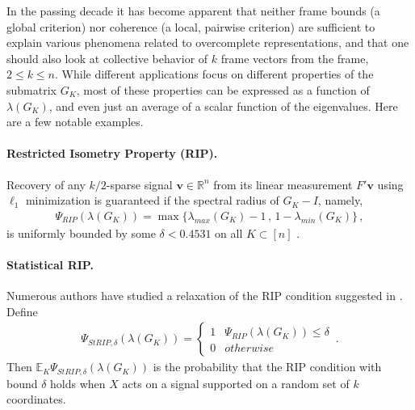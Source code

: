 \documentclass[a4paper,12pt]{article}
\newcommand{\comm}[1]{ {\tt \color{blue} [Comment:#1] } }
\newcommand{\V}[1]{\ensuremath{\mathbf{#1}}}
\newcommand{\R}{\ensuremath{\mathbb{R}}}
\newcommand{\E}{\ensuremath{\mathbb{E}}}
\newcommand{\m}{m}
\newcommand{\specstat}{\ensuremath{\Psi}}
\newcommand{\Gk}{\ensuremath{G_K}}
\begin{document}
In the passing decade it has become
apparent that neither frame bounds (a global criterion) 
nor coherence (a local, pairwise criterion) are
sufficient to
explain various phenomena related to overcomplete representations, and that
one should also look at collective behavior of $k$ frame vectors from the
frame, $2\leq k \leq n$. 
%
%
%
While different applications focus on different properties of the submatrix
$\Gk$, most of these properties can be expressed as a function of
$\lambda(\Gk)$,
and even just an average of a scalar function of the eigenvalues. Here are a few notable examples. 
%
\paragraph{Restricted Isometry Property (RIP).} 
%
Recovery of any $k/2$-sparse
signal $\V{v}\in\R^n$ from its linear measurement $F'\V{v}$ using $\ell_1$
minimization is guaranteed if the spectral radius of $\Gk - I$, namely,
\begin{eqnarray} \label{rip_func:eq}
\specstat_{RIP}(\lambda(\Gk))= 
\max\{ \lambda_{max}(\Gk)-1 \,,\,
1-\lambda_{min}(\Gk) \}\,, 
\end{eqnarray} 
is uniformly bounded by some $\delta<0.4531$ on all $K\subset[n]$
\cite{CT06, Candes-RIP,Lai}.

\paragraph{Statistical RIP.} Numerous authors have studied a relaxation of the
RIP condition suggested in \cite{Caulderbank-STRIP}. Define 
\begin{eqnarray} \label{strip_func:eq}
\specstat_{StRIP,\delta}(\lambda(\Gk)) =
\begin{cases} 1 &  \specstat_{RIP}(\lambda(\Gk)) \leq
\delta \\ 
0 & otherwise \end{cases}\,.  
\end{eqnarray}
Then
$\E_K \specstat_{StRIP,\delta}(\lambda(\Gk))$ is
the probability that the RIP condition 
with bound $\delta$ holds when $X$ acts on a signal
supported on a random set of $k$ coordinates.
%
%
\end{document}
